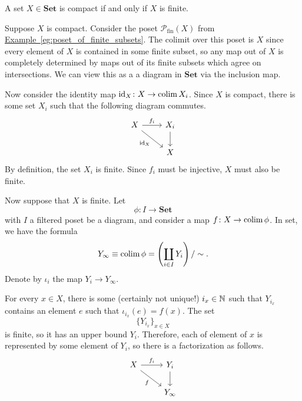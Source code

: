 \documentclass[main.tex]{subfiles}
\begin{document}
\begin{example}
  A set $X \in \mathbf{Set}$ is compact if and only if $X$ is finite.

  Suppose $X$ is compact. Consider the poset $\mathcal{P}_{\mathrm{fin}}(X)$ from \hyperref[eg:poset_of_finite_subsets]{Example~\ref*{eg:poset_of_finite_subsets}}. The colimit over this poset is $X$ since every element of $X$ is contained in some finite subset, so any map out of $X$ is completely determined by maps out of its finite subsets which agree on intersections. We can view this as a a diagram in $\mathbf{Set}$ via the inclusion map.

  Now consider the identity map $\mathrm{id}_{X}\colon X \to \operatorname*{colim} X_{i}$. Since $X$ is compact, there is some set $X_{i}$ such that the following diagram commutes.
  \begin{equation*}
    \begin{tikzcd}
      X
      \arrow[rd, swap, "\id_{X}"]
      \arrow[r, "f_{i}"]
      & X_{i}
      \arrow[d]
      \\
      & X
    \end{tikzcd}
  \end{equation*}
  By definition, the set $X_{i}$ is finite. Since $f_{i}$ must be injective, $X$ must also be finite.

  Now suppose that $X$ is finite. Let
  \begin{equation*}
    \phi\colon I \to \mathbf{Set}
  \end{equation*}
  with $I$ a filtered poset be a diagram, and consider a map $f\colon X \to \operatorname*{colim} \phi$. In set, we have the formula
  \begin{equation*}
    Y_{\infty} \equiv \operatorname*{colim} \phi = \left( \coprod_{i \in I} Y_{i} \right)/\sim.
  \end{equation*}
  Denote by $\iota_{i}$ the map $Y_{i} \to Y_{\infty}$.

  For every $x \in X$, there is some (certainly not unique!) $i_{x} \in \mathbb{N}$ such that $Y_{i_{x}}$ contains an element $e$ such that $\iota_{i_{x}}(e) = f(x)$. The set
  \begin{equation*}
    \{Y_{i_{x}}\}_{x \in X}
  \end{equation*}
  is finite, so it has an upper bound $Y_{i}$. Therefore, each of element of $x$ is represented by some element of $Y_{i}$, so there is a factorization as follows.
  \begin{equation*}
    \begin{tikzcd}
      X
      \arrow[r, "f_{i}"]
      \arrow[dr, swap, "f"]
      & Y_{i}
      \arrow[d]
      \\
      & Y_{\infty}
    \end{tikzcd}
  \end{equation*}


\end{example}
\end{document}
